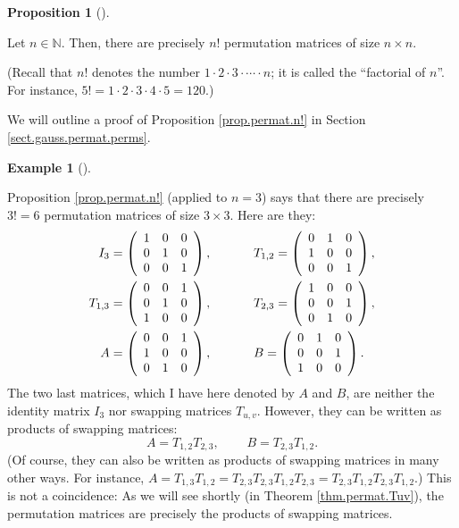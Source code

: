 \documentclass[numbers=enddot,12pt,final,onecolumn,notitlepage]{scrartcl}%
\theoremstyle{definition}
\newtheorem{prop}[theo]{Proposition}
\newenvironment{proposition}[1][]
{\begin{prop}[#1]\begin{leftbar}}
{\end{leftbar}\end{prop}}
\newtheorem{exam}[theo]{Example}
\newenvironment{example}[1][]
{\begin{exam}[#1]\begin{leftbar}}
{\end{leftbar}\end{exam}}
\begin{document}
\begin{proposition}
\label{prop.permat.n!}Let $n\in\mathbb{N}$. Then, there are precisely $n!$
permutation matrices of size $n\times n$.

(Recall that $n!$ denotes the number $1\cdot2\cdot3\cdot\cdots\cdot n$; it is
called the \textquotedblleft factorial of $n$\textquotedblright. For instance,
$5!=1\cdot2\cdot3\cdot4\cdot5=120$.)
\end{proposition}

We will outline a proof of Proposition \ref{prop.permat.n!} in Section
\ref{sect.gauss.permat.perms}.

\begin{example}
Proposition \ref{prop.permat.n!} (applied to $n=3$) says that there are
precisely $3!=6$ permutation matrices of size $3\times3$. Here are they:%
\begin{align*}
I_{3}  &  =\left(
\begin{array}
[c]{ccc}%
1 & 0 & 0\\
0 & 1 & 0\\
0 & 0 & 1
\end{array}
\right)  ,\ \ \ \ \ \ \ \ \ \ T_{1,2}=\left(
\begin{array}
[c]{ccc}%
0 & 1 & 0\\
1 & 0 & 0\\
0 & 0 & 1
\end{array}
\right)  ,\\
T_{1,3}  &  =\left(
\begin{array}
[c]{ccc}%
0 & 0 & 1\\
0 & 1 & 0\\
1 & 0 & 0
\end{array}
\right)  ,\ \ \ \ \ \ \ \ \ \ T_{2,3}=\left(
\begin{array}
[c]{ccc}%
1 & 0 & 0\\
0 & 0 & 1\\
0 & 1 & 0
\end{array}
\right)  ,\\
A  &  =\left(
\begin{array}
[c]{ccc}%
0 & 0 & 1\\
1 & 0 & 0\\
0 & 1 & 0
\end{array}
\right)  ,\ \ \ \ \ \ \ \ \ \ B=\left(
\begin{array}
[c]{ccc}%
0 & 1 & 0\\
0 & 0 & 1\\
1 & 0 & 0
\end{array}
\right)  .
\end{align*}
The two last matrices, which I have here denoted by $A$ and $B$, are neither
the identity matrix $I_{3}$ nor swapping matrices $T_{u,v}$. However, they can
be written as products of swapping matrices:%
\[
A=T_{1,2}T_{2,3},\ \ \ \ \ \ \ \ \ \ B=T_{2,3}T_{1,2}.
\]
(Of course, they can also be written as products of swapping matrices in many
other ways. For instance, $A=T_{1,3}T_{1,2}=T_{2,3}T_{2,3}T_{1,2}%
T_{2,3}=T_{2,3}T_{1,2}T_{2,3}T_{1,2}$.) This is not a coincidence: As we will
see shortly (in Theorem \ref{thm.permat.Tuv}), the permutation matrices are
precisely the products of swapping matrices.
\end{example}
\end{document}
